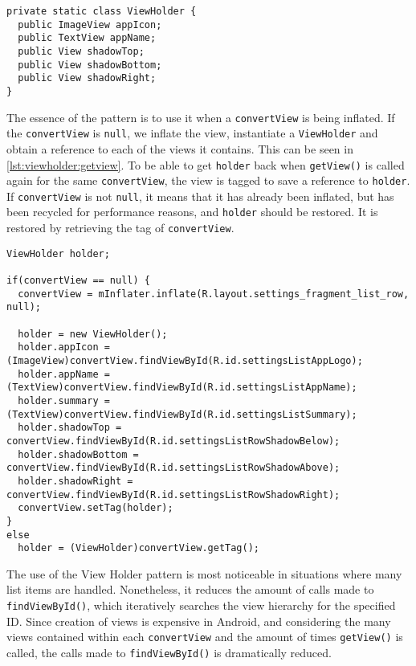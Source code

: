 \begin{lstlisting}[caption={The intent filter and action a \giraf application has to provide to be shown in settings.}, label={lst:viewholder}]
private static class ViewHolder {
  public ImageView appIcon;
  public TextView appName;
  public View shadowTop;
  public View shadowBottom;
  public View shadowRight;
}
\end{lstlisting}

The essence of the pattern is to use it when a \lstinline|convertView| is being inflated.
If the \lstinline|convertView| is \lstinline|null|, we inflate the view, instantiate a \lstinline|ViewHolder| and obtain a reference to each of the views it contains.
This can be seen in \cref{lst:viewholder:getview}.
To be able to get \lstinline|holder| back when \lstinline|getView()| is called again for the same \lstinline|convertView|, the view is tagged to save a reference to \lstinline|holder|.
If \lstinline|convertView| is not \lstinline|null|, it means that it has already been inflated, but has been recycled for performance reasons, and \lstinline|holder| should be restored.
It is restored by retrieving the tag of \lstinline|convertView|.

\begin{lstlisting}[caption={Excerpt of the refactored \lstinline|getView()| method in \lstinline|SettingsListAdapter|.}, label={lst:viewholder:getview}]
ViewHolder holder;

if(convertView == null) {
  convertView = mInflater.inflate(R.layout.settings_fragment_list_row, null);

  holder = new ViewHolder();
  holder.appIcon = (ImageView)convertView.findViewById(R.id.settingsListAppLogo);
  holder.appName = (TextView)convertView.findViewById(R.id.settingsListAppName);
  holder.summary = (TextView)convertView.findViewById(R.id.settingsListSummary);
  holder.shadowTop = convertView.findViewById(R.id.settingsListRowShadowBelow);
  holder.shadowBottom = convertView.findViewById(R.id.settingsListRowShadowAbove);
  holder.shadowRight = convertView.findViewById(R.id.settingsListRowShadowRight);
  convertView.setTag(holder);
}
else
  holder = (ViewHolder)convertView.getTag();
\end{lstlisting}

The use of the View Holder pattern is most noticeable in situations where many list items are handled.
Nonetheless, it reduces the amount of calls made to \lstinline|findViewById()|, which iteratively searches the view hierarchy for the specified ID.
Since creation of views is expensive in Android, and considering the many views contained within each \lstinline|convertView| and the amount of times \lstinline|getView()| is called, the calls made to  \lstinline|findViewById()| is dramatically reduced.\cite{understandingAdapters}

